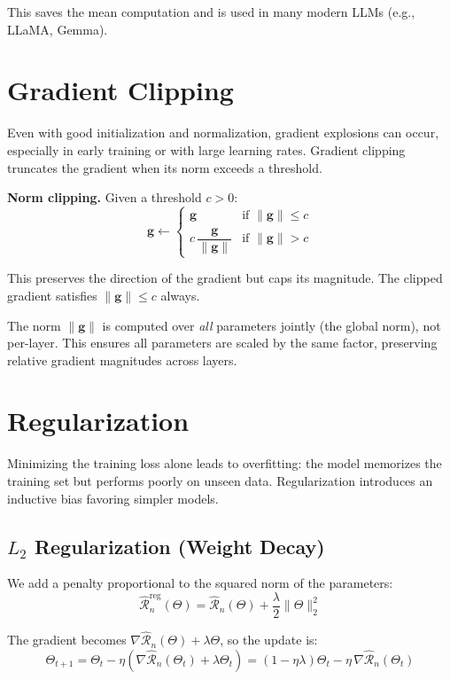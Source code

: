 \documentclass[main.tex]{subfiles}
\begin{document}
This saves the mean computation and is used in many modern LLMs (e.g., LLaMA, Gemma).

\needspace{0.33\textheight}
\section{Gradient Clipping}

Even with good initialization and normalization, gradient explosions can occur, especially in early training or with large learning rates. Gradient clipping truncates the gradient when its norm exceeds a threshold.

\textbf{Norm clipping.} Given a threshold $c > 0$:
$$\mathbf{g} \leftarrow \begin{cases} \mathbf{g} & \text{if } \|\mathbf{g}\| \leq c \\[4pt] c\,\dfrac{\mathbf{g}}{\|\mathbf{g}\|} & \text{if } \|\mathbf{g}\| > c \end{cases}$$

This preserves the direction of the gradient but caps its magnitude. The clipped gradient satisfies $\|\mathbf{g}\| \leq c$ always.

\begin{remark}
The norm $\|\mathbf{g}\|$ is computed over \textit{all} parameters jointly (the global norm), not per-layer. This ensures all parameters are scaled by the same factor, preserving relative gradient magnitudes across layers.
\end{remark}

\needspace{0.33\textheight}
\section{Regularization}

Minimizing the training loss alone leads to overfitting: the model memorizes the training set but performs poorly on unseen data. Regularization introduces an inductive bias favoring simpler models.

\subsection{$L_2$ Regularization (Weight Decay)}

We add a penalty proportional to the squared norm of the parameters:
$$\hat{\mathcal{R}}_n^{\text{reg}}(\Theta) = \hat{\mathcal{R}}_n(\Theta) + \frac{\lambda}{2}\|\Theta\|_2^2$$

The gradient becomes $\nabla\hat{\mathcal{R}}_n(\Theta) + \lambda\Theta$, so the update is:
$$\Theta_{t+1} = \Theta_t - \eta\left(\nabla\hat{\mathcal{R}}_n(\Theta_t) + \lambda\Theta_t\right) = (1 - \eta\lambda)\Theta_t - \eta\,\nabla\hat{\mathcal{R}}_n(\Theta_t)$$
\end{document}
